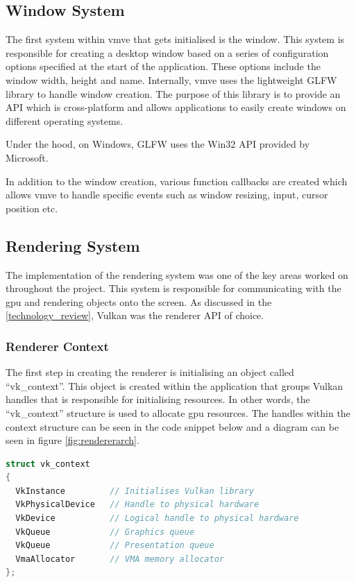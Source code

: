 \documentclass[11pt]{article}
\begin{document}
  

\subsection{Window System}
The first system within \gls*{vmve} that gets initialised is the window. This system is
responsible for creating a desktop window based on a series of configuration
options specified at the start of the application. These options include the
window width, height and name. Internally, \gls*{vmve} uses the lightweight GLFW
library to handle window creation. The purpose of this library is to provide an
API which is cross-platform and allows applications to easily create windows on
different operating systems. 

Under the hood, on Windows, GLFW uses the Win32 API provided by Microsoft.

In addition to the window creation, various function callbacks are created
which allows \gls*{vmve} to handle specific events such as window resizing, input,
cursor position etc.

\subsection{Rendering System}
The implementation of the rendering system was one of the key areas worked on
throughout the project. This system is responsible for communicating with the
\gls*{gpu} and rendering objects onto the screen. As discussed in the
\ref{technology_review}, Vulkan was the renderer API of choice. 

    

\subsubsection{Renderer Context}
The first step in creating the renderer is initialising an object called
``vk\_context''. This object is created within the application that groups
Vulkan handles that is responsible for initialising resources. In other words,
the ``vk\_context'' structure is used to allocate \gls*{gpu} resources. The
handles within the context structure can be seen in the code snippet below and a
diagram can be seen in figure \ref{fig:rendererarch}.

\begin{lstlisting}[language=C++]
struct vk_context
{
  VkInstance         // Initialises Vulkan library
  VkPhysicalDevice   // Handle to physical hardware
  VkDevice           // Logical handle to physical hardware
  VkQueue            // Graphics queue
  VkQueue            // Presentation queue
  VmaAllocator       // VMA memory allocator
};
\end{lstlisting}
\end{document}
